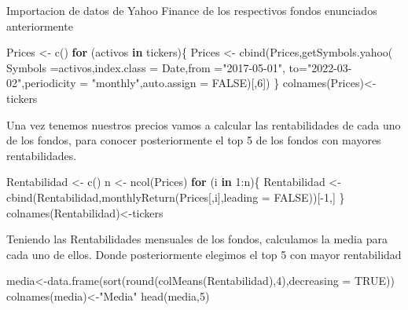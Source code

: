 \documentclass[
  12pt,
]{article}
\newenvironment{Shaded}{\begin{snugshade}}{\end{snugshade}}
\newcommand{\AttributeTok}[1]{\textcolor[rgb]{0.77,0.63,0.00}{#1}}
\newcommand{\ConstantTok}[1]{\textcolor[rgb]{0.00,0.00,0.00}{#1}}
\newcommand{\ControlFlowTok}[1]{\textcolor[rgb]{0.13,0.29,0.53}{\textbf{#1}}}
\newcommand{\DecValTok}[1]{\textcolor[rgb]{0.00,0.00,0.81}{#1}}
\newcommand{\FunctionTok}[1]{\textcolor[rgb]{0.00,0.00,0.00}{#1}}
\newcommand{\NormalTok}[1]{#1}
\newcommand{\OtherTok}[1]{\textcolor[rgb]{0.56,0.35,0.01}{#1}}
\newcommand{\SpecialCharTok}[1]{\textcolor[rgb]{0.00,0.00,0.00}{#1}}
\newcommand{\StringTok}[1]{\textcolor[rgb]{0.31,0.60,0.02}{#1}}
\begin{document}
Importacion de datos de Yahoo Finance de los respectivos fondos
enunciados anteriormente

\begin{Shaded}
\begin{Highlighting}[]
\NormalTok{Prices }\OtherTok{\textless{}{-}} \FunctionTok{c}\NormalTok{()}
\ControlFlowTok{for}\NormalTok{ (activos }\ControlFlowTok{in}\NormalTok{ tickers)\{}
\NormalTok{  Prices }\OtherTok{\textless{}{-}} \FunctionTok{cbind}\NormalTok{(Prices,}\FunctionTok{getSymbols.yahoo}\NormalTok{(}
    \AttributeTok{Symbols =}\NormalTok{activos,}\AttributeTok{index.class  =} \StringTok{\textquotesingle{}Date\textquotesingle{}}\NormalTok{,}\AttributeTok{from =}\StringTok{"2017{-}05{-}01"}\NormalTok{,}
    \AttributeTok{to=}\StringTok{"2022{-}03{-}02"}\NormalTok{,}\AttributeTok{periodicity =} \StringTok{"monthly"}\NormalTok{,}\AttributeTok{auto.assign =} \ConstantTok{FALSE}\NormalTok{)[,}\DecValTok{6}\NormalTok{])}
\NormalTok{\}}
\FunctionTok{colnames}\NormalTok{(Prices)}\OtherTok{\textless{}{-}}\NormalTok{tickers}
\end{Highlighting}
\end{Shaded}

Una vez tenemos nuestros precios vamos a calcular las rentabilidades de
cada uno de los fondos, para conocer posteriormente el top 5 de los
fondos con mayores rentabilidades.

\begin{Shaded}
\begin{Highlighting}[]
\NormalTok{Rentabilidad }\OtherTok{\textless{}{-}} \FunctionTok{c}\NormalTok{()}
\NormalTok{n }\OtherTok{\textless{}{-}} \FunctionTok{ncol}\NormalTok{(Prices)}
\ControlFlowTok{for}\NormalTok{ (i }\ControlFlowTok{in} \DecValTok{1}\SpecialCharTok{:}\NormalTok{n)\{}
\NormalTok{    Rentabilidad }\OtherTok{\textless{}{-}} \FunctionTok{cbind}\NormalTok{(Rentabilidad,}\FunctionTok{monthlyReturn}\NormalTok{(Prices[,i],}\AttributeTok{leading =} \ConstantTok{FALSE}\NormalTok{))[}\SpecialCharTok{{-}}\DecValTok{1}\NormalTok{,]}
\NormalTok{\}}
\FunctionTok{colnames}\NormalTok{(Rentabilidad)}\OtherTok{\textless{}{-}}\NormalTok{tickers  }
\end{Highlighting}
\end{Shaded}

Teniendo las Rentabilidades mensuales de los fondos, calculamos la media
para cada uno de ellos. Donde posteriormente elegimos el top 5 con mayor
rentabilidad

\begin{Shaded}
\begin{Highlighting}[]
\NormalTok{media}\OtherTok{\textless{}{-}}\FunctionTok{data.frame}\NormalTok{(}\FunctionTok{sort}\NormalTok{(}\FunctionTok{round}\NormalTok{(}\FunctionTok{colMeans}\NormalTok{(Rentabilidad),}\DecValTok{4}\NormalTok{),}\AttributeTok{decreasing =} \ConstantTok{TRUE}\NormalTok{))}
\FunctionTok{colnames}\NormalTok{(media)}\OtherTok{\textless{}{-}}\StringTok{"Media"}
\FunctionTok{head}\NormalTok{(media,}\DecValTok{5}\NormalTok{)}
\end{Highlighting}
\end{Shaded}
\end{document}
